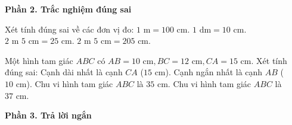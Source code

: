 \textbf{Phần 2. Trắc nghiệm đúng sai}

\begin{ex} %
Xét tính đúng sai về các đơn vị đo:
\choiceTF
{\True $1\text{ m} = 100\text{ cm}$.}
{\True $1\text{ dm} = 10\text{ cm}$.}
{$2\text{ m } 5\text{ cm} = 25\text{ cm}$.}
{\True $2\text{ m } 5\text{ cm} = 205\text{ cm}$.}
\end{ex}

\begin{ex} %
Một hình tam giác $ABC$ có $AB = 10\text{ cm}, BC = 12\text{ cm}, CA = 15\text{ cm}$. Xét tính đúng sai:
\choiceTF
{\True Cạnh dài nhất là cạnh $CA$ ($15\text{ cm}$).}
{\True Cạnh ngắn nhất là cạnh $AB$ ($10\text{ cm}$).}
{Chu vi hình tam giác $ABC$ là $35\text{ cm}$.}
{\True Chu vi hình tam giác $ABC$ là $37\text{ cm}$.}
\end{ex}

\textbf{Phần 3. Trả lời ngắn}

